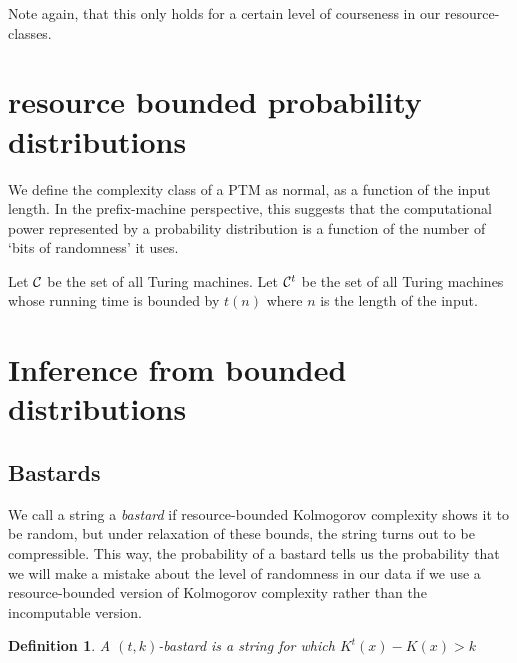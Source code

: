 \documentclass[10pt,a4paper,oneside]{article}
\newtheorem{dfn}{Definition}
\begin{document}
Note again, that this only holds for a certain level of courseness in our resource-classes.

\section*{resource bounded probability distributions}

We define the complexity class of a PTM as normal, as a function of the input length. In the prefix-machine perspective, this suggests that the computational power represented by a probability distribution is a function of the number of `bits of randomness' it uses.

Let $\cal C$ be the set of all Turing machines. Let ${\cal C}^t$ be the set of all Turing machines whose running time is bounded by $t(n)$ where $n$ is the length of the input.


\section*{Inference from bounded distributions}

\subsection*{Bastards}

We call a string a \emph{bastard} if resource-bounded Kolmogorov complexity shows it to be random, but under relaxation of these bounds, the string turns out to be compressible. This way, the probability of a bastard tells us the probability that we will make a mistake about the level of randomness in our data if we use a resource-bounded version of Kolmogorov complexity rather than the incomputable version.
  

\begin{dfn}
A \emph{$(t, k)$-bastard} is a string for which $K^t(x) - K(x) > k$
\end{dfn}
\end{document}
